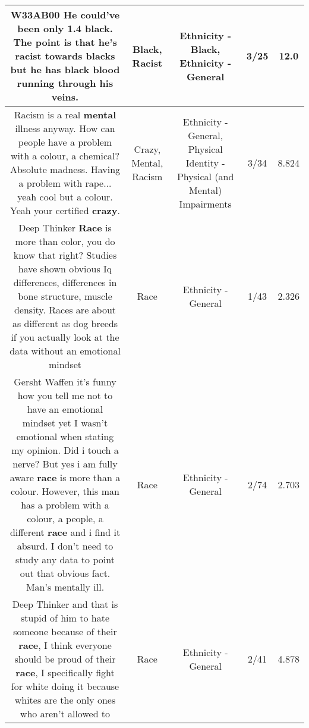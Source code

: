 \documentclass[11pt]{article}
\newlength\mylength
\begin{document}
\begin{center}
\begin{longtable}{|C{.65\mylength}|C{.30\mylength}|C{.12\mylength}|C{.12\mylength}|C{.12\mylength}|}
  \small W33AB00 He could've been only 1.4  \textbf{black}.  The point is that he's \textbf{racist} towards blacks but he has \textbf{black} blood running through his veins.\normalsize   & Black, Racist & Ethnicity - Black, Ethnicity - General & 3/25 & 12.0 \\  \hline
  \small Racism is a real \textbf{mental} illness anyway. How can people have a problem with a colour, a chemical? Absolute madness. Having a problem with rape... yeah cool but a colour. Yeah your certified \textbf{crazy}.\normalsize   & Crazy, Mental, Racism & Ethnicity - General, Physical Identity - Physical (and Mental) Impairments & 3/34 & 8.824 \\  \hline
  \small Deep Thinker \textbf{Race} is more than color, you do know that right? Studies have shown obvious Iq differences, differences in bone structure, muscle density. Races are about as different as dog breeds if you actually look at the data without an emotional mindset\normalsize   & Race & Ethnicity - General & 1/43 & 2.326 \\  \hline
  \small Gersht Waffen it's funny how you tell me not to have an emotional mindset yet I wasn't emotional when stating my opinion. Did i touch a nerve? But yes i am fully aware \textbf{race} is more than a colour. However, this man has a problem with a colour, a people, a different \textbf{race} and i find it absurd. I don't need to study any data to point out that obvious fact. Man's mentally ill.\normalsize   & Race & Ethnicity - General & 2/74 & 2.703 \\  \hline
  \small Deep Thinker and that is stupid of him to hate someone because of their \textbf{race}, I think everyone should be proud of their \textbf{race}, I specifically fight for white doing it because whites are the only ones who aren't allowed to\normalsize   & Race & Ethnicity - General & 2/41 & 4.878 \\  \hline

\end{longtable}
\end{center}
\end{document}
